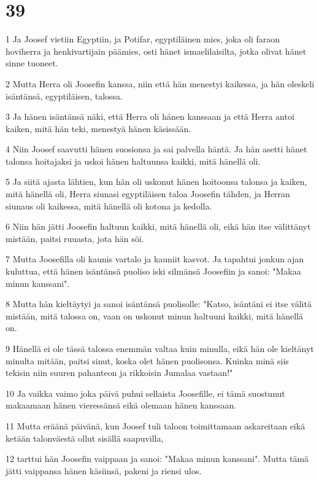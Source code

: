 \chapter{39}

\par 1 Ja Joosef vietiin Egyptiin, ja Potifar, egyptiläinen mies, joka oli faraon hoviherra ja henkivartijain päämies, osti hänet ismaelilaisilta, jotka olivat hänet sinne tuoneet.
\par 2 Mutta Herra oli Joosefin kanssa, niin että hän menestyi kaikessa, ja hän oleskeli isäntänsä, egyptiläisen, talossa.
\par 3 Ja hänen isäntänsä näki, että Herra oli hänen kanssaan ja että Herra antoi kaiken, mitä hän teki, menestyä hänen käsissään.
\par 4 Niin Joosef saavutti hänen suosionsa ja sai palvella häntä. Ja hän asetti hänet talonsa hoitajaksi ja uskoi hänen haltuunsa kaikki, mitä hänellä oli.
\par 5 Ja siitä ajasta lähtien, kun hän oli uskonut hänen hoitoonsa talonsa ja kaiken, mitä hänellä oli, Herra siunasi egyptiläisen taloa Joosefin tähden, ja Herran siunaus oli kaikessa, mitä hänellä oli kotona ja kedolla.
\par 6 Niin hän jätti Joosefin haltuun kaikki, mitä hänellä oli, eikä hän itse välittänyt mistään, paitsi ruuasta, jota hän söi.
\par 7 Mutta Joosefilla oli kaunis vartalo ja kauniit kasvot. Ja tapahtui jonkun ajan kuluttua, että hänen isäntänsä puoliso iski silmänsä Joosefiin ja sanoi: "Makaa minun kanssani".
\par 8 Mutta hän kieltäytyi ja sanoi isäntänsä puolisolle: "Katso, isäntäni ei itse välitä mistään, mitä talossa on, vaan on uskonut minun haltuuni kaikki, mitä hänellä on.
\par 9 Hänellä ei ole tässä talossa enemmän valtaa kuin minulla, eikä hän ole kieltänyt minulta mitään, paitsi sinut, koska olet hänen puolisonsa. Kuinka minä siis tekisin niin suuren pahanteon ja rikkoisin Jumalaa vastaan!"
\par 10 Ja vaikka vaimo joka päivä puhui sellaista Joosefille, ei tämä suostunut makaamaan hänen vieressänsä eikä olemaan hänen kanssaan.
\par 11 Mutta eräänä päivänä, kun Joosef tuli taloon toimittamaan askareitaan eikä ketään talonväestä ollut sisällä saapuvilla,
\par 12 tarttui hän Joosefin vaippaan ja sanoi: "Makaa minun kanssani". Mutta tämä jätti vaippansa hänen käsiinsä, pakeni ja riensi ulos.
